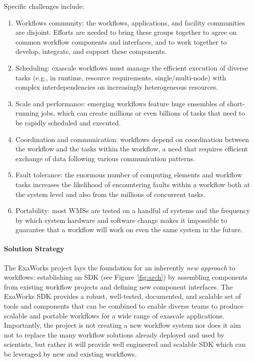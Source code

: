 Specific challenges include: 
\begin{enumerate}
    \item Workflows community: the workflows, applications, and facility communities are disjoint. 
    Efforts are needed to bring these groups together to agree on common workflow components and interfaces, 
    and to work together to develop, integrate, and support these components.
    \item Scheduling: exascale workflows must manage the efficient execution of diverse
    tasks (e.g., in runtime, resource requirements, single/multi-node) with complex interdependencies on increasingly heterogeneous resources. 
    \item Scale and performance: emerging workflows feature huge ensembles of short-running jobs, 
    which can create millions or even billions of tasks that need to be rapidly scheduled and executed.
    \item Coordination and communication: workflows depend on coordination between the workflow and 
    the tasks within the workflow, a need that requires efficient exchange of data following various communication patterns.
    \item Fault tolerance: the enormous number of computing elements and workflow tasks increases 
    the likelihood of encountering faults within a workflow both at the system level and also from the millions of concurrent tasks. 
    \item Portability: most WMSs are tested on a handful of systems and the frequency by which
    system hardware and software change makes it impossible to guarantee that a workflow will work on even the same system in the future.
\end{enumerate}

\paragraph{Solution Strategy}
The ExaWorks project lays the foundation for an inherently
\textit{new approach} to workflows: establishing an SDK (see
Figure~\ref{fig:arch}) by assembling components from existing workflow
projects and defining new component interfaces. The ExaWorks SDK provides a robust, well-tested, documented,
and scalable set of tools and components that can be combined to enable diverse teams to
produce scalable and portable workflows for a wide range of exascale
applications. Importantly, the project is not creating a new workflow system
nor does it aim not to replace the many workflow solutions already deployed
and used by scientists, but rather it will provide well engineered and
scalable SDK which can be leveraged by new and existing workflows.


